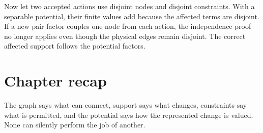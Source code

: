 Now let two accepted actions use disjoint nodes and disjoint constraints.
With a separable potential, their finite values add because the affected
terms are disjoint. If a new pair factor couples one node from each action,
the independence proof no longer applies even though the physical edges
remain disjoint. The correct affected support follows the potential factors.

\section*{Chapter recap}
The graph says what can connect, support says what changes, constraints say
what is permitted, and the potential says how the represented change is
valued. None can silently perform the job of another.
